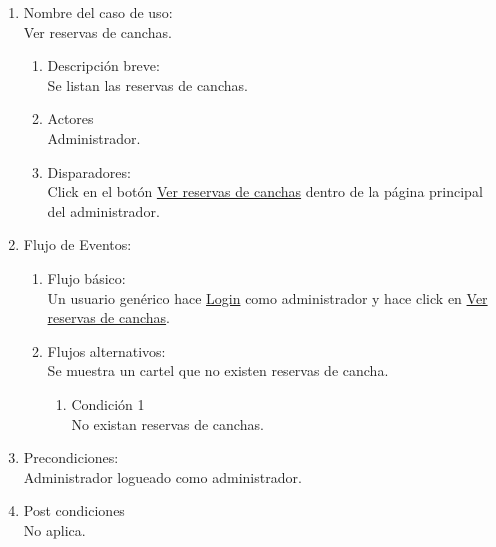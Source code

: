\documentclass[a4paper,11pt]{article}
\begin{document}
\renewcommand{\theenumiii}{\arabic{enumiii}.}
\renewcommand{\labelenumiii}{\theenumiii}

\begin{enumerate}

    \item Nombre del caso de uso: \\
    Ver reservas de canchas.

    \begin{enumerate}
    \item Descripción breve: \\
        Se listan las reservas de canchas.
    \item Actores \\
        Administrador.
    \item Disparadores: \\
        Click en el botón \underline{Ver reservas de canchas} dentro de la
        página principal del administrador.
    \end{enumerate}

    \item Flujo de Eventos: \\

    \begin{enumerate}

        \item Flujo básico:\\
            Un usuario genérico hace \underline{Login} como administrador y
            hace click en \underline{Ver reservas de canchas}.
        \item Flujos alternativos:\\
            Se muestra un cartel que no existen reservas de cancha.
            \begin{enumerate}
                \item Condición 1 \\
                    No existan reservas de canchas.
            \end{enumerate}

    \end{enumerate}

    \item Precondiciones: \\
        Administrador logueado como administrador.

    \item Post condiciones \\
        No aplica.

\end{enumerate}
\end{document}
